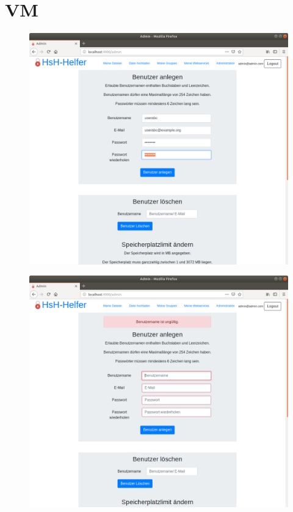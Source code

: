 \documentclass[12pt,DIV14,BCOR10mm,a4paper,parskip=half-,headsepline,headinclude,english,ngerman,bibliography=totocnumbered]{scrreprt}
\begin{document}
\vspace*{-3cm}

\tableofcontents  %

\chapter{VM}

\begin{figure}[!htb]
\hspace*{-2.5cm}
	\includegraphics[width=0.8\paperwidth]{resources/createuser_fail_1.png}
	\label{createuser_fail_1}
\end{figure}

\begin{figure}[!htb]
\hspace*{-2.5cm}
	\includegraphics[width=0.8\paperwidth]{resources/createuser_fail_2.png}
	\label{createuser_fail_2}
\end{figure}
\end{document}
